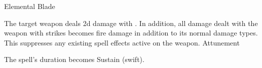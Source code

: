 \begin{spellsection}{Elemental Blade}
\begin{spellheader}
\end{spellheader}
\begin{spellcontent}
\begin{spelltargetinginfo}
\end{spelltargetinginfo}
\begin{spelleffects}
\spelleffect
The target weapon deals \plus2d damage with .
In addition, all damage dealt with the weapon with strikes becomes fire damage in addition to its normal damage types.
This suppresses any existing spell effects active on the weapon.
\spelldur Attunement
\end{spelleffects}
\end{spellcontent}
\begin{spellfooter}
\miscastexplode
\end{spellfooter}
\begin{spellcantrip}
The spell's duration becomes Sustain (swift).
\end{spellcantrip}
\end{spellsection}

